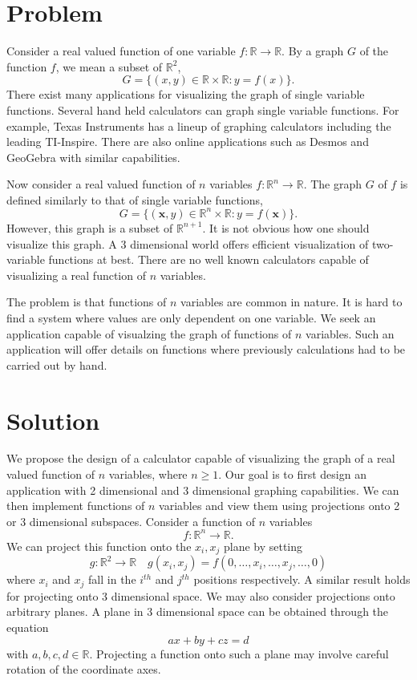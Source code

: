 \documentclass{article}
\newcommand{\makevspace}{\vspace{0.5cm}}
\begin{document}
 {\Large

\section{Problem}
Consider a real valued function of one variable $f:\mathbb{R} \to \mathbb{R}$. By a 
graph $G$ of the function $f$, we mean a subset of $\mathbb{R}^2$,
\[
	G = \{ (x, y) \in \mathbb{R} \times \mathbb{R} : y = f(x) \}.	
\]
There exist many applications for visualizing the graph of single variable functions.
Several hand held calculators can graph single variable functions. 
For example, Texas Instruments has a lineup of graphing calculators including
the leading TI-Inspire. 
There are also online applications such as Desmos and GeoGebra with similar capabilities.

\makevspace

Now consider a real valued function of $n$ variables $f:\mathbb{R}^n \to \mathbb{R}$.
The graph $G$ of $f$ is defined similarly to that of single variable functions,
\[
	G = \{ (\mathbf{x}, y) \in \mathbb{R}^n \times \mathbb{R} : y = f(\mathbf{x}) \}.	
\]
However, this graph is a subset of $\mathbb{R}^{n+1}$.
It is not obvious how one should visualize this graph.
A 3 dimensional world offers efficient visualization of two-variable functions at best. 
There are no well known calculators capable of visualizing a real function of $n$ variables.

\makevspace

The problem is that functions of $n$ variables are common in nature. 
It is hard to find a system where values are only dependent on one variable. 
We seek an application capable of visualzing the graph of functions of $n$ variables.
Such an application will offer details on functions where previously calculations had to 
be carried out by hand.

\newpage
\section{Solution}
We propose the design of a calculator capable of visualizing the graph of a 
real valued function of $n$ variables, where $n\geq 1$. Our goal is to first design an
application with 2 dimensional and 3 dimensional graphing capabilities. We can then 
implement functions of $n$ variables and view them using projections onto 2 or 3 
dimensional subspaces. Consider a function of $n$ variables 
\[
	f: \mathbb{R}^n \to \mathbb{R}.	
\]
We can project this function onto the $x_i, x_j$ plane by setting 
\[
	g: \mathbb{R}^2 \to \mathbb{R} \quad 
	g(x_i, x_j) = f(0, \dots, x_i, \dots, x_j, \dots, 0)	
\]
where $x_i$ and $x_j$ fall in the $i^{th}$ and $j^{th}$ positions respectively.
A similar result holds for projecting onto 3 dimensional space. 
We may also consider projections onto arbitrary planes. 
A plane in 3 dimensional space can be obtained through the equation 
\[
	ax + by + cz = d 	
\]
with $a,b,c,d\in\mathbb{R}$. Projecting a function onto such a plane 
may involve careful rotation of the coordinate axes. 

}
\end{document}
